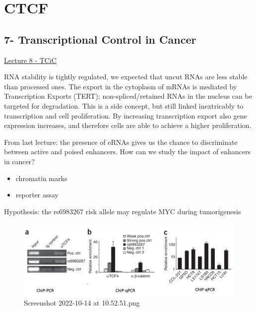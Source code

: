 \graphicspath{{chapters/_resources/}}

\chapter{CTCF}



\hypertarget{transcriptional-control-in-cancer}{%
\section{7- Transcriptional Control in Cancer}\label{transcriptional-control-in-cancer}}

\href{:/debeaed24e9c444e88c9a5ad1e251391}{Lecture 8 - TCiC}

RNA stability is tightly regulated, we expected that uncut RNAs are less stable than processed ones. The export in the cytoplasm of mRNAs is mediated by Transcription Exports (TERT); non-spliced/retained RNAs in the nucleus can be targeted for degradation. This is a side concept, but still linked inextricably to transcription and cell proliferation. By increasing transcription export also gene expression increases, and therefore cells are able to achieve a higher proliferation.

From last lecture: the presence of eRNAs gives us the chance to discriminate between active and poised enhancers. How can we study the impact of enhancers in cancer?

\begin{itemize}
\tightlist
\item
  chromatin marks
\item
  reporter assay
\end{itemize}

Hypothesis: the rs6983267 risk allele may regulate MYC during tumorigenesis

\begin{figure}
\centering
\includegraphics[width=\textwidth]{../_resources/Screenshot_2022-10-14_at_10-52-51.png}
\caption{Screenshot 2022-10-14 at 10.52.51.png}
\end{figure}

